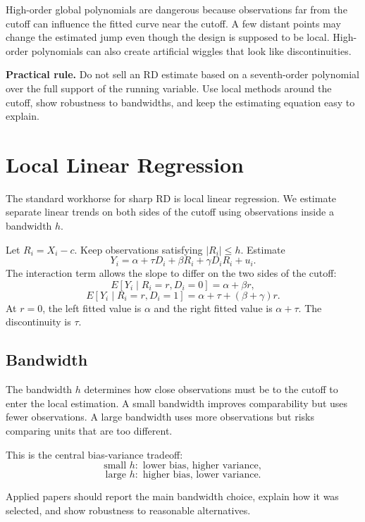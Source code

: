 High-order global polynomials are dangerous because observations far from the cutoff can influence the fitted curve near the cutoff. A few distant points may change the estimated jump even though the design is supposed to be local. High-order polynomials can also create artificial wiggles that look like discontinuities.

\begin{boxF}
\textbf{Practical rule.} Do not sell an RD estimate based on a seventh-order polynomial over the full support of the running variable. Use local methods around the cutoff, show robustness to bandwidths, and keep the estimating equation easy to explain.
\end{boxF}

\section{Local Linear Regression}

The standard workhorse for sharp RD is local linear regression. We estimate separate linear trends on both sides of the cutoff using observations inside a bandwidth $h$.

Let $R_i=X_i-c$. Keep observations satisfying $|R_i|\leq h$. Estimate
\[
    Y_i = \alpha + \tau D_i + \beta R_i + \gamma D_iR_i + u_i.
\]
The interaction term allows the slope to differ on the two sides of the cutoff:
\[
    E[Y_i\mid R_i=r, D_i=0] = \alpha + \beta r,
\]
\[
    E[Y_i\mid R_i=r, D_i=1] = \alpha + \tau + (\beta+\gamma)r.
\]
At $r=0$, the left fitted value is $\alpha$ and the right fitted value is $\alpha+\tau$. The discontinuity is $\tau$.

\subsection{Bandwidth}

The bandwidth $h$ determines how close observations must be to the cutoff to enter the local estimation. A small bandwidth improves comparability but uses fewer observations. A large bandwidth uses more observations but risks comparing units that are too different.

This is the central bias-variance tradeoff:
\[
    \text{small }h: \text{ lower bias, higher variance},
\]
\[
    \text{large }h: \text{ higher bias, lower variance}.
\]

Applied papers should report the main bandwidth choice, explain how it was selected, and show robustness to reasonable alternatives.


